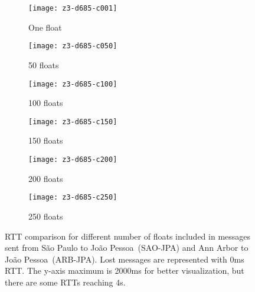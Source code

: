 \begin{figure*}[!ht]
	\centering
	\begin{subfigure}{.45\textwidth}
		\texttt{[image: z3-d685-c001]}
		\caption{One float}
		\label{fig:z3-d685-c001}
	\end{subfigure}
	\begin{subfigure}{.45\textwidth}
		\texttt{[image: z3-d685-c050]}
		\caption{50 floats}
		\label{fig:z3-d685-c050}
	\end{subfigure}
	\par\bigskip
	\begin{subfigure}{.45\textwidth}
		\texttt{[image: z3-d685-c100]}
		\caption{100 floats}
		\label{fig:z3-d685-c100}
	\end{subfigure}
	\begin{subfigure}{.45\textwidth}
		\texttt{[image: z3-d685-c150]}
		\caption{150 floats}
		\label{fig:z3-d685-4-c150}
	\end{subfigure}
	\bigskip
	\begin{subfigure}{.45\textwidth}
		\texttt{[image: z3-d685-c200]}
		\caption{200 floats}
		\label{fig:z3-d685-c200}
	\end{subfigure}
	\begin{subfigure}{.45\textwidth}
		\texttt{[image: z3-d685-c250]}
		\caption{250 floats}
		\label{fig:z3-d685-c250}
	\end{subfigure} 
	
	\caption{RTT comparison for different number of floats included in messages sent from São Paulo to João Pessoa~(SAO-JPA) and Ann Arbor to João Pessoa~(ARB-JPA). Lost messages are represented with 0ms RTT. The y-axis maximum is 2000ms for better visualization, but there are some RTTs reaching 4s.}
	\label{fig:z3-d685-evaluation}
\end{figure*}


